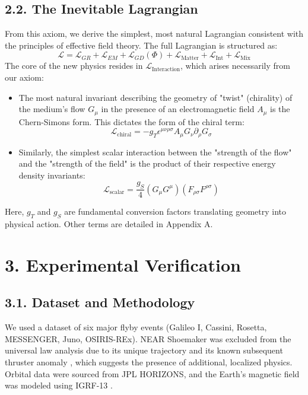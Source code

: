 \documentclass[aps,prl,twocolumn,superscriptaddress,longbibliography,floatfix]{revtex4-2}
\begin{document}
\subsection{2.2. The Inevitable Lagrangian}
From this axiom, we derive the simplest, most natural Lagrangian consistent with the principles of effective field theory. The full Lagrangian is structured as:
\begin{equation}
    \mathcal{L} = \mathcal{L}_{GR} + \mathcal{L}_{EM} + \mathcal{L}_{GD}(\Phi) + \mathcal{L}_{\text{Matter}} + \mathcal{L}_{\text{Int}} + \mathcal{L}_{\text{Mix}}
\end{equation}
The core of the new physics resides in $\mathcal{L}_{\text{Interaction}}$, which arises necessarily from our axiom:
\begin{itemize}
    \item The most natural invariant describing the geometry of "twist" (chirality) of the medium's flow $G_\mu$ in the presence of an electromagnetic field $A_\mu$ is the Chern-Simons form. This dictates the form of the chiral term:
    \begin{equation}
        \mathcal{L}_{\text{chiral}} = -g_T \epsilon^{\mu\nu\rho\sigma} A_\mu G_\nu \partial_\rho G_\sigma
    \end{equation}
    \item Similarly, the simplest scalar interaction between the "strength of the flow" and the "strength of the field" is the product of their respective energy density invariants:
    \begin{equation}
        \mathcal{L}_{\text{scalar}} = \frac{g_S}{4} (G_\mu G^\mu)(F_{\rho\sigma}F^{\rho\sigma})
    \end{equation}
\end{itemize}
Here, $g_T$ and $g_S$ are fundamental conversion factors translating geometry into physical action. Other terms are detailed in Appendix A.

\section{3. Experimental Verification}

\subsection{3.1. Dataset and Methodology}
We used a dataset of six major flyby events (Galileo I, Cassini, Rosetta, MESSENGER, Juno, OSIRIS-REx). NEAR Shoemaker was excluded from the universal law analysis due to its unique trajectory and its known subsequent thruster anomaly \cite{NASA_NEAR_Report}, which suggests the presence of additional, localized physics. Orbital data were sourced from JPL HORIZONS, and the Earth's magnetic field was modeled using IGRF-13 \cite{IGRF13}.
\end{document}

